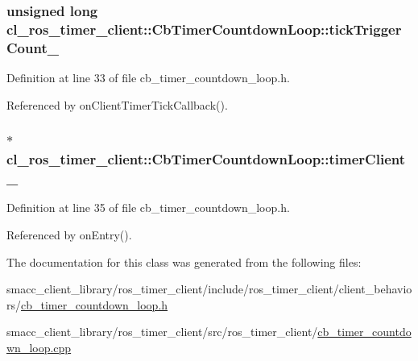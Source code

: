 \subsubsection[{\texorpdfstring{tick\+Trigger\+Count\+\_\+}{tickTriggerCount_}}]{\setlength{\rightskip}{0pt plus 5cm}unsigned long cl\+\_\+ros\+\_\+timer\+\_\+client\+::\+Cb\+Timer\+Countdown\+Loop\+::tick\+Trigger\+Count\+\_\+\hspace{0.3cm}{\ttfamily [private]}}\hypertarget{classcl__ros__timer__client_1_1CbTimerCountdownLoop_ab8d6a5bac52e06fc892389eb9865f35a}{}\label{classcl__ros__timer__client_1_1CbTimerCountdownLoop_ab8d6a5bac52e06fc892389eb9865f35a}


Definition at line 33 of file cb\+\_\+timer\+\_\+countdown\+\_\+loop.\+h.



Referenced by on\+Client\+Timer\+Tick\+Callback().

\subsubsection[{\texorpdfstring{timer\+Client\+\_\+}{timerClient_}}]{$\ast$ cl\+\_\+ros\+\_\+timer\+\_\+client\+::\+Cb\+Timer\+Countdown\+Loop\+::timer\+Client\+\_\+\hspace{0.3cm}{\ttfamily [private]}}\hypertarget{classcl__ros__timer__client_1_1CbTimerCountdownLoop_a65087775400463db541196f9fb6c83f9}{}\label{classcl__ros__timer__client_1_1CbTimerCountdownLoop_a65087775400463db541196f9fb6c83f9}


Definition at line 35 of file cb\+\_\+timer\+\_\+countdown\+\_\+loop.\+h.



Referenced by on\+Entry().



The documentation for this class was generated from the following files\+:\begin{DoxyCompactItemize}
\item 
smacc\+\_\+client\+\_\+library/ros\+\_\+timer\+\_\+client/include/ros\+\_\+timer\+\_\+client/client\+\_\+behaviors/\hyperlink{cb__timer__countdown__loop_8h}{cb\+\_\+timer\+\_\+countdown\+\_\+loop.\+h}\item 
smacc\+\_\+client\+\_\+library/ros\+\_\+timer\+\_\+client/src/ros\+\_\+timer\+\_\+client/\hyperlink{cb__timer__countdown__loop_8cpp}{cb\+\_\+timer\+\_\+countdown\+\_\+loop.\+cpp}\end{DoxyCompactItemize}
